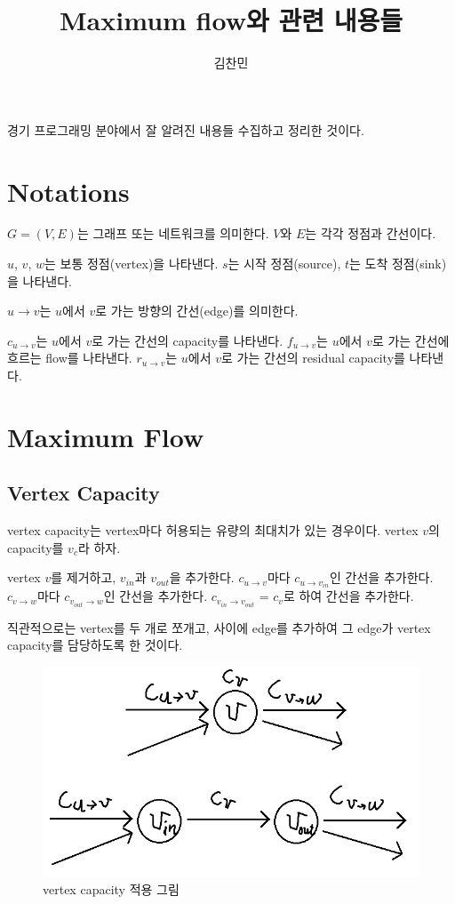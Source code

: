 \documentclass[10pt,twocolumn,letterpaper]{article}
\begin{document}
\title{Maximum flow와 관련 내용들}
\author{김찬민}

\maketitle

경기 프로그래밍 분야에서 잘 알려진 내용들 수집하고 정리한 것이다.

\section{Notations}

$G=(V,E)$는 그래프 또는 네트워크를 의미한다. $V$와 $E$는 각각 정점과 간선이다.

$u$, $v$, $w$는 보통 정점(vertex)을 나타낸다.
$s$는 시작 정점(source), $t$는 도착 정점(sink)을 나타낸다.

$u \rightarrow v$는 $u$에서 $v$로 가는 방향의 간선(edge)를 의미한다.

$c_{u \rightarrow v}$는 $u$에서 $v$로 가는 간선의 capacity를 나타낸다.
$f_{u \rightarrow v}$는 $u$에서 $v$로 가는 간선에 흐르는 flow를 나타낸다.
$r_{u \rightarrow v}$는 $u$에서 $v$로 가는 간선의 residual capacity를 나타낸다.

\section{Maximum Flow}

\subsection{Vertex Capacity}

vertex capacity는 vertex마다 허용되는 유량의 최대치가 있는 경우이다.  vertex $v$의 capacity를 $v_c$라 하자.

vertex $v$를 제거하고, $v_{in}$과 $v_{out}$을 추가한다.
$c_{u \rightarrow v}$마다 $c_{u \rightarrow v_{in}}$인 간선을 추가한다.
$c_{v \rightarrow w}$마다 $c_{v_{out} \rightarrow w}$인 간선을 추가한다.
$c_{v_{in} \rightarrow v_{out}}$ = $c_{v}$로 하여 간선을 추가한다.

직관적으로는 vertex를 두 개로 쪼개고, 사이에 edge를 추가하여 그 edge가 vertex capacity를 담당하도록 한 것이다.

\begin{figure}
\includegraphics[width=0.9\linewidth]{vertex_doubling.png}
\caption{vertex capacity 적용 그림}
\end{figure}
\end{document}
